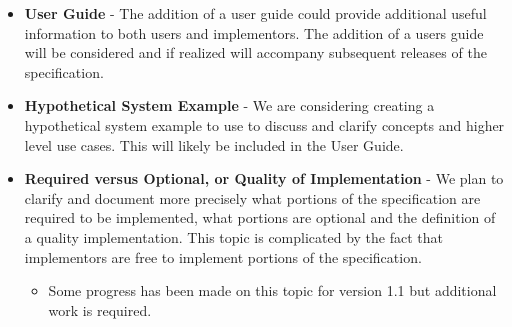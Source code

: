 \documentclass[12pt]{report} %
\providecommand{\DIFaddend}{} %
\DeclareRobustCommand{\DIFaddend}{\DIFOaddend \let\includegraphics\DIFOincludegraphics} %
\begin{document}
\begin{appendices}
\begin{itemize}[noitemsep,nolistsep]
\item{\textbf{User Guide} - The addition of a user guide could provide additional useful information to both users and implementors. The addition of a users guide will be considered and if realized will accompany subsequent releases of the specification.
}
\item{\textbf{Hypothetical System Example} - We are considering creating a hypothetical system example to use to discuss and clarify concepts and higher level use cases. This will likely be included in the User Guide.
}
\item{\textbf{Required versus Optional, or Quality of Implementation} - We plan to clarify and document more precisely what portions of the specification are required to be implemented, what portions are optional and the definition of a quality implementation. This topic is complicated by the fact that implementors are free to implement portions of the specification. 
}
    \begin{itemize}
        \item{Some progress has been made on this topic for version 1.1 but additional work is required.}
    \DIFaddend \end{itemize}


\end{itemize}
\end{appendices}
\end{document}
